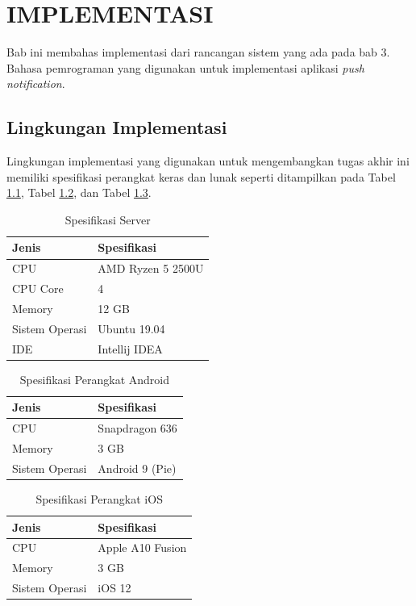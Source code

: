 \chapter {IMPLEMENTASI}
\par Bab ini membahas implementasi dari rancangan sistem yang ada pada bab 3. Bahasa pemrograman yang digunakan untuk implementasi aplikasi \textit{push notification}.

\section{Lingkungan Implementasi}
\par Lingkungan implementasi yang digunakan untuk mengembangkan tugas akhir ini memiliki spesifikasi perangkat keras dan lunak seperti ditampilkan pada Tabel \ref{tabel_spesifikasi_server}, Tabel \ref{tabel_spesifikasi_perangkat_android}, dan Tabel \ref{tabel_spesifikasi_perangkat_ios}.
\begin{table}[H]
	\centering
	\begin{tabularx}{0.75\textwidth}{|l|X|}
		\hline
		\textbf{Jenis} & \textbf{Spesifikasi} \\ \hline
		CPU & AMD Ryzen 5 2500U \\ \hline
		CPU Core & 4 \\ \hline
		Memory & 12 GB \\ \hline
		Sistem Operasi & Ubuntu 19.04 \\ \hline
		IDE & Intellij IDEA \\ \hline
	\end{tabularx}
	\caption{Spesifikasi Server}
	\label{tabel_spesifikasi_server}
\end{table}
\begin{table}[H]
	\centering
	\begin{tabularx}{0.75\textwidth}{|l|X|}
		\hline
		\textbf{Jenis} & \textbf{Spesifikasi} \\ \hline
		CPU & Snapdragon 636 \\ \hline
		Memory & 3 GB \\ \hline
		Sistem Operasi & Android 9 (Pie) \\ \hline
	\end{tabularx}
	\caption{Spesifikasi Perangkat Android}
	\label{tabel_spesifikasi_perangkat_android}
\end{table}
\begin{table}[H]
	\centering
	\begin{tabularx}{0.75\textwidth}{|l|X|}
		\hline
		\textbf{Jenis} & \textbf{Spesifikasi} \\ \hline
		CPU & Apple A10 Fusion \\ \hline
		Memory & 3 GB \\ \hline
		Sistem Operasi & iOS 12 \\ \hline
	\end{tabularx}
	\caption{Spesifikasi Perangkat iOS}
	\label{tabel_spesifikasi_perangkat_ios}
\end{table}

